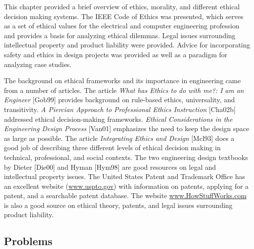 This chapter provided a brief overview of ethics, morality, and
different ethical decision making systems. The IEEE Code of Ethics was
presented, which serves as a set of ethical values for the electrical
and computer engineering profession and provides a basis for analyzing
ethical dilemmas. Legal issues surrounding intellectual property and
product liability were provided. Advice for incorporating safety and
ethics in design projects was provided as well as a paradigm for
analyzing case studies.

The background on ethical frameworks and its importance in engineering
came from a number of articles. The article \emph{What has Ethics to do
with me?: I am an Engineer} {[}Gob99{]} provides background on
rule-based ethics, universality, and transitivity. \emph{A Piercian
Approach to Professional Ethics Instruction} {[}Cha02b{]} addressed
ethical decision-making frameworks. \emph{Ethical Considerations in the
Engineering Design Process} {[}Van01{]} emphasizes the need to keep the
design space as large as possible. The article \emph{Integrating Ethics
and Design} {[}Mcl93{]} does a good job of describing three different
levels of ethical decision making in technical, professional, and social
contexts. The two engineering design textbooks by Dieter {[}Die00{]} and
Hyman {[}Hym98{]} are good resources on legal and intellectual property
issues. The United States Patent and Trademark Office has an excellent
website (\href{http://www.uspto.gov}{www.uspto.gov}) with information on
patents, applying for a patent, and a searchable patent database. The
website \href{http://www.HowStuffWorks.com}{www.HowStuffWorks.com} is
also a good source on ethical theory, patents, and legal issues
surrounding product liability.

\subsection{Problems}\label{problems}

